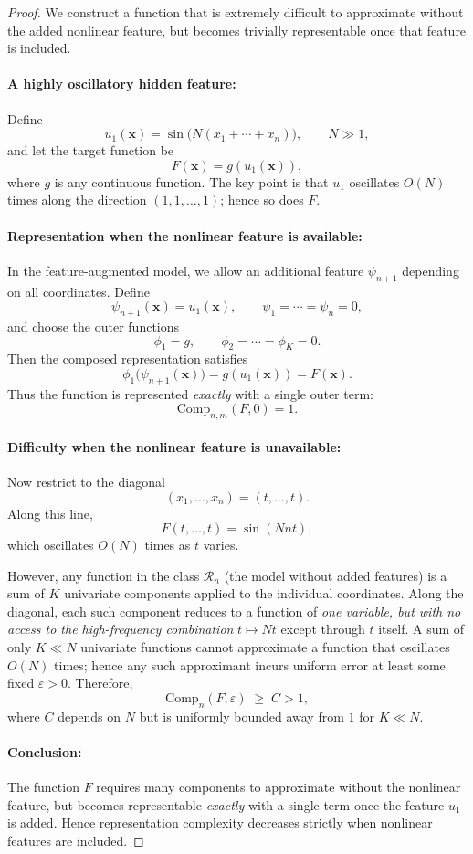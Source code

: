 \documentclass[10pt,a4paper]{amsart}
\begin{document}
\begin{proof}
We construct a function that is extremely difficult to approximate without the
added nonlinear feature, but becomes trivially representable once that feature 
is included.

\paragraph{A highly oscillatory hidden feature:}
Define
\[
u_1(\mathbf{x})=\sin\!\big(N(x_1+\cdots+x_n)\big), \qquad N\gg 1,
\]
and let the target function be
\[
F(\mathbf{x})=g(u_1(\mathbf{x})),
\]
where $g$ is any continuous function.  
The key point is that $u_1$ oscillates $O(N)$ times along the direction 
$(1,1,\dots,1)$; hence so does $F$.

\paragraph{ Representation when the nonlinear feature is available:}
In the feature-augmented model, we allow an additional feature $\psi_{n+1}$ 
depending on all coordinates.  Define
\[
\psi_{n+1}(\mathbf{x}) = u_1(\mathbf{x}), 
\qquad
\psi_1 = \cdots = \psi_n = 0,
\]
and choose the outer functions
\[
\phi_1 = g,
\qquad 
\phi_2=\cdots=\phi_K=0.
\]
Then the composed representation satisfies
\[
\phi_1\big(\psi_{n+1}(\mathbf{x})\big) = g(u_1(\mathbf{x})) = F(\mathbf{x}).
\]
Thus the function is represented \emph{exactly} with a single outer term:
\[
\mathrm{Comp}_{n,m}(F,0) = 1.
\]

\paragraph{Difficulty when the nonlinear feature is unavailable:}
Now restrict to the diagonal
\[
(x_1,\dots,x_n)=(t,\dots,t).
\]
Along this line,
\[
F(t,\dots,t)=\sin(N n t),
\]
which oscillates $O(N)$ times as $t$ varies.

However, any function in the class $\mathcal{R}_n$ (the model without added
features) is a sum of $K$ univariate components applied to the individual
coordinates.  Along the diagonal, each such component reduces to a function of
\emph{one variable, but with no access to the high-frequency combination}
$t \mapsto Nt$ except through $t$ itself.  
A sum of only $K\ll N$ univariate functions cannot approximate a function that
oscillates $O(N)$ times; hence any such approximant incurs uniform error at 
least some fixed $\varepsilon>0$.  Therefore,
\[
\mathrm{Comp}_n(F,\varepsilon) \;\ge\; C > 1,
\]
where $C$ depends on $N$ but is uniformly bounded away from $1$ for 
$K\ll N$.

\paragraph{Conclusion:}
The function $F$ requires many components to approximate without the nonlinear
feature, but becomes representable \emph{exactly} with a single term once the
feature $u_1$ is added.  Hence representation complexity decreases strictly when 
nonlinear features are included.
\end{proof}
\end{document}
